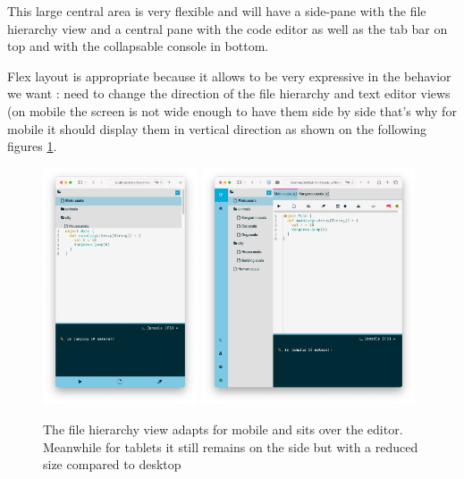 \documentclass[a4paper,11pt,oneside]{report}
\begin{document}
\newpage

This large central area is very flexible and will have a side-pane with the file hierarchy view and a central pane with the code editor as well as the tab bar on top and with the collapsable console in bottom.

Flex layout is appropriate because it allows to be very expressive in the behavior we want : need to change the direction of the file hierarchy and text editor views (on mobile the screen is not wide enough to have them side by side that's why for mobile it should display them in vertical direction as shown on the following figures \ref{iphone}.

\begin{figure}[h]
\centering
\includegraphics[height=7cm]{iphone.jpeg}
\includegraphics[height=7cm]{ipad.jpeg}
\caption{The file hierarchy view adapts for mobile and sits over the editor. Meanwhile for tablets it still remains on the side but with a reduced size compared to desktop}
\label{iphone}
\end{figure}
\end{document}
